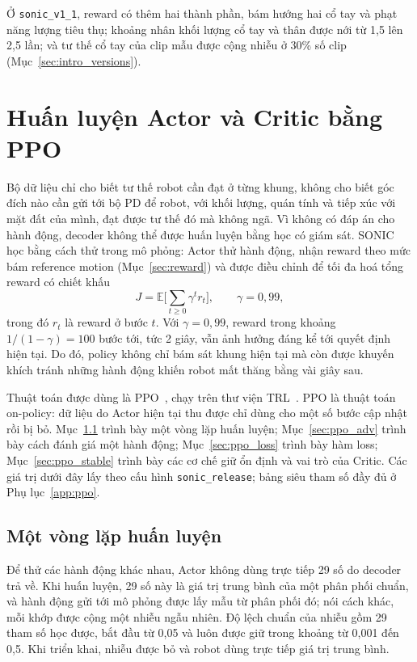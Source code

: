\documentclass[12pt,a4paper,oneside]{report}
\newcommand{\code}[1]{\texttt{#1}}
\begin{document}
Ở \code{sonic\_v1\_1}, reward có thêm hai thành phần, bám hướng hai cổ tay và phạt năng lượng tiêu thụ; khoảng nhân khối lượng cổ tay và thân được nới từ 1,5 lên 2,5 lần; và tư thế cổ tay của clip mẫu được cộng nhiễu ở 30\% số clip (Mục~\ref{sec:intro_versions}).

\section{Huấn luyện Actor và Critic bằng PPO}
\label{sec:ppo}

Bộ dữ liệu chỉ cho biết tư thế robot cần đạt ở từng khung, không cho biết góc đích nào cần gửi tới bộ PD để robot, với khối lượng, quán tính và tiếp xúc với mặt đất của mình, đạt được tư thế đó mà không ngã. Vì không có đáp án cho hành động, decoder không thể được huấn luyện bằng học có giám sát. SONIC học bằng cách thử trong mô phỏng: Actor thử hành động, nhận reward theo mức bám reference motion (Mục~\ref{sec:reward}) và được điều chỉnh để tối đa hoá tổng reward có chiết khấu
\begin{equation}
J = \mathbb{E}\Big[\sum_{t \ge 0} \gamma^{t} r_t\Big], \qquad \gamma = 0{,}99,
\label{eq:ppo_objective}
\end{equation}
trong đó $r_t$ là reward ở bước $t$. Với $\gamma = 0{,}99$, reward trong khoảng $1/(1-\gamma) = 100$ bước tới, tức 2 giây, vẫn ảnh hưởng đáng kể tới quyết định hiện tại. Do đó, policy không chỉ bám sát khung hiện tại mà còn được khuyến khích tránh những hành động khiến robot mất thăng bằng vài giây sau.

Thuật toán được dùng là PPO~\cite{ppo}, chạy trên thư viện TRL~\cite{trl}. PPO là thuật toán on-policy: dữ liệu do Actor hiện tại thu được chỉ dùng cho một số bước cập nhật rồi bị bỏ. Mục~\ref{sec:ppo_iter} trình bày một vòng lặp huấn luyện; Mục~\ref{sec:ppo_adv} trình bày cách đánh giá một hành động; Mục~\ref{sec:ppo_loss} trình bày hàm loss; Mục~\ref{sec:ppo_stable} trình bày các cơ chế giữ ổn định và vai trò của Critic. Các giá trị dưới đây lấy theo cấu hình \code{sonic\_release}; bảng siêu tham số đầy đủ ở Phụ lục~\ref{app:ppo}.

\subsection{Một vòng lặp huấn luyện}
\label{sec:ppo_iter}

Để thử các hành động khác nhau, Actor không dùng trực tiếp 29 số do decoder trả về. Khi huấn luyện, 29 số này là giá trị trung bình của một phân phối chuẩn, và hành động gửi tới mô phỏng được lấy mẫu từ phân phối đó; nói cách khác, mỗi khớp được cộng một nhiễu ngẫu nhiên. Độ lệch chuẩn của nhiễu gồm 29 tham số học được, bắt đầu từ 0,05 và luôn được giữ trong khoảng từ 0,001 đến 0,5. Khi triển khai, nhiễu được bỏ và robot dùng trực tiếp giá trị trung bình.
\end{document}
